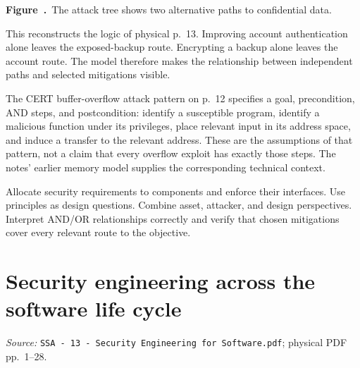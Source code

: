 \documentclass[11pt,a4paper]{article}
\newcommand{\currentmodule}{Contents}
\newcommand{\source}[2]{\textcolor{muted}{\small\textit{Source:} \nolinkurl{#1}; physical PDF pp.~#2.}\par\medskip}
\newcommand{\module}[2]{\par\Needspace{8\baselineskip}\gdef\currentmodule{#1}\section{#1}\label{#2}}
\numberwithin{figure}{section}
\newcommand{\diagramcaption}[1]{\par\smallskip\refstepcounter{figure}\begin{center}\small\textbf{Figure~\thefigure.}~#1\end{center}}
\begin{document}
\begin{center}\end{center}
\diagramcaption{The attack tree shows two alternative paths to confidential data.}
This reconstructs the logic of physical p.~13. Improving account authentication alone leaves the exposed-backup route. Encrypting a backup alone leaves the account route. The model therefore makes the relationship between independent paths and selected mitigations visible.

The CERT buffer-overflow attack pattern on p.~12 specifies a goal, precondition, AND steps, and postcondition: identify a susceptible program, identify a malicious function under its privileges, place relevant input in its address space, and induce a transfer to the relevant address. These are the assumptions of that pattern, not a claim that every overflow exploit has exactly those steps. The notes' earlier memory model supplies the corresponding technical context.

\begin{takeaway}
Allocate security requirements to components and enforce their interfaces. Use principles as design questions. Combine asset, attacker, and design perspectives. Interpret AND/OR relationships correctly and verify that chosen mitigations cover every relevant route to the objective.
\end{takeaway}

\module{Security engineering across the software life cycle}{sec:sdl}
\source{SSA - 13 - Security Engineering for Software.pdf}{1--28}
\end{document}
